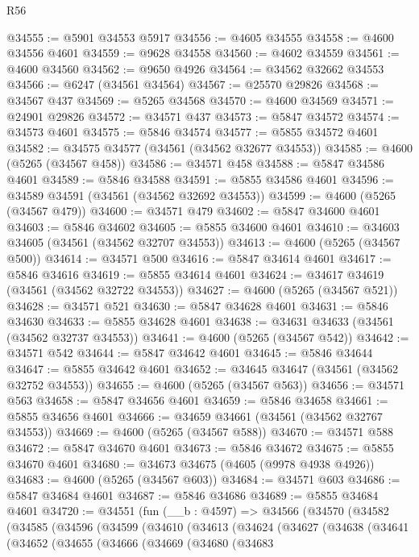 \begin{lexlean}{R56}
\begin{coremodule}
@34555 := @5901 @34553 @5917
@34556 := @4605 @34555
@34558 := @4600 @34556 @4601
@34559 := @9628 @34558
@34560 := @4602 @34559
@34561 := @4600 @34560
@34562 := @9650 @4926
@34564 := @34562 @32662 @34553
@34566 := @6247 (@34561 @34564)
@34567 := @25570 @29826
@34568 := @34567 @437
@34569 := @5265 @34568
@34570 := @4600 @34569
@34571 := @24901 @29826
@34572 := @34571 @437
@34573 := @5847 @34572
@34574 := @34573 @4601
@34575 := @5846 @34574
@34577 := @5855 @34572 @4601
@34582 := @34575 @34577 (@34561 (@34562 @32677 @34553))
@34585 := @4600 (@5265 (@34567 @458))
@34586 := @34571 @458
@34588 := @5847 @34586 @4601
@34589 := @5846 @34588
@34591 := @5855 @34586 @4601
@34596 := @34589 @34591 (@34561 (@34562 @32692 @34553))
@34599 := @4600 (@5265 (@34567 @479))
@34600 := @34571 @479
@34602 := @5847 @34600 @4601
@34603 := @5846 @34602
@34605 := @5855 @34600 @4601
@34610 := @34603 @34605 (@34561 (@34562 @32707 @34553))
@34613 := @4600 (@5265 (@34567 @500))
@34614 := @34571 @500
@34616 := @5847 @34614 @4601
@34617 := @5846 @34616
@34619 := @5855 @34614 @4601
@34624 := @34617 @34619 (@34561 (@34562 @32722 @34553))
@34627 := @4600 (@5265 (@34567 @521))
@34628 := @34571 @521
@34630 := @5847 @34628 @4601
@34631 := @5846 @34630
@34633 := @5855 @34628 @4601
@34638 := @34631 @34633 (@34561 (@34562 @32737 @34553))
@34641 := @4600 (@5265 (@34567 @542))
@34642 := @34571 @542
@34644 := @5847 @34642 @4601
@34645 := @5846 @34644
@34647 := @5855 @34642 @4601
@34652 := @34645 @34647 (@34561 (@34562 @32752 @34553))
@34655 := @4600 (@5265 (@34567 @563))
@34656 := @34571 @563
@34658 := @5847 @34656 @4601
@34659 := @5846 @34658
@34661 := @5855 @34656 @4601
@34666 := @34659 @34661 (@34561 (@34562 @32767 @34553))
@34669 := @4600 (@5265 (@34567 @588))
@34670 := @34571 @588
@34672 := @5847 @34670 @4601
@34673 := @5846 @34672
@34675 := @5855 @34670 @4601
@34680 := @34673 @34675 (@4605 (@9978 @4938 @4926))
@34683 := @4600 (@5265 (@34567 @603))
@34684 := @34571 @603
@34686 := @5847 @34684 @4601
@34687 := @5846 @34686
@34689 := @5855 @34684 @4601
@34720 := @34551
    (fun (__b : @4597) =>
    @34566
      (@34570
        (@34582
          (@34585
            (@34596
              (@34599
                (@34610
                  (@34613
                    (@34624
                      (@34627
                        (@34638
                          (@34641
                            (@34652
                              (@34655
                                (@34666
                                  (@34669
                                    (@34680
                                      (@34683

\end{coremodule}
\end{lexlean}
